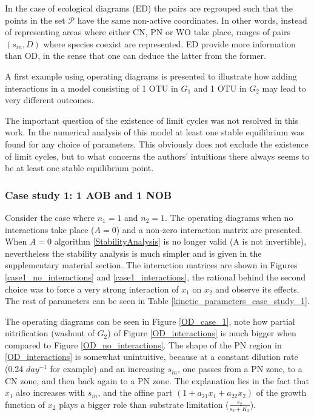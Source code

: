 \documentclass[processes,article,submit,moreauthors,pdftex]{Definitions/mdpi}
\begin{document}
In the case of ecological diagrams (ED) the pairs are regrouped such that the points in the set $\mathcal{P}$ have the same non-active coordinates. In other words, instead of representing areas where either CN, PN or WO take place, ranges of pairs $(s_{in},D)$ where species coexist are represented.	ED provide more information than OD, in the sense that one can deduce the latter from the former. 

A first example using operating diagrams is presented to illustrate how adding interactions in a model consisting of 1 OTU in $G_1$ and 1 OTU in $G_2$ may lead to very different outcomes.

The important question of the existence of limit cycles was not resolved in this work. In the numerical analysis of this model at least one stable equilibrium was found for any choice of parameters. This obviously does not exclude the existence of limit cycles, but to what concerns the authors' intuitions there always seems to be at least one stable equilibrium point.

\subsubsection{Case study 1: 1 AOB and 1 NOB}

Consider the case where $n_1 = 1$ and $n_2 = 1$. The operating diagrams when no interactions take place ($A = 0$) and a non-zero interaction matrix are presented. When $A=0$ algorithm \ref{StabilityAnalysis} is no longer valid (A is not invertible), nevertheless the stability analysis is much simpler and is given in the supplementary material section. The interaction matrices are shown in Figures \ref{case1_no_interactions} and \ref{case1_interactions}, the rational behind the second choice was to force a very strong interaction of $x_1$ on $x_2$ and observe its effects. The rest of parameters can be seen in Table \ref{kinetic_parameters_case_study_1}.

The operating diagrams can be seen in Figure \ref{OD_case_1}, note how partial nitrification (washout of $G_2$) of Figure \ref{OD_interactions} is much bigger when compared to Figure \ref{OD_no_interactions}. The shape of the PN region in \ref{OD_interactions} is somewhat unintuitive, because at a constant dilution rate (0.24 $day^{-1}$ for example) and an increasing $s_{in}$, one passes from a PN zone, to a CN zone, and then back again to a PN zone. The explanation lies in the fact that $x_1$ also increases with $s_{in}$, and the affine part $(1+ a_{21}x_1 +a_{22}x_2)$ of the growth function of $x_2$ plays a bigger role than substrate limitation ($\frac{s_2}{s_2+K_2}$). 
\end{document}
